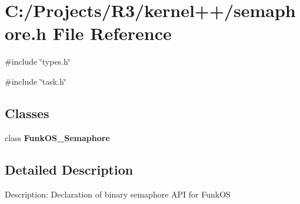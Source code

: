 \section{C:/Projects/R3/kernel++/semaphore.h File Reference}
\label{semaphore_8h}
{\ttfamily \#include \char`\"{}types.h\char`\"{}}\par
{\ttfamily \#include \char`\"{}task.h\char`\"{}}\par
\subsection*{Classes}
\begin{DoxyCompactItemize}
\item 
class {\bf FunkOS\_\-Semaphore}
\end{DoxyCompactItemize}


\subsection{Detailed Description}
Description: Declaration of binary semaphore API for FunkOS 